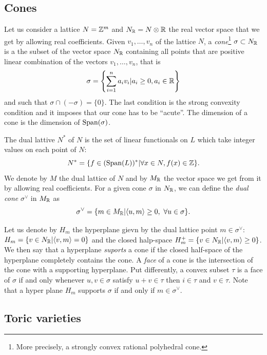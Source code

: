     \subsection{Cones}

        Let us consider a lattice $N=\mathbb{Z}^m$ and $N_{\mathbb{R}}=N\otimes\mathbb{R}$ the real vector space that we get by allowing real coefficients. Given $v_1,\dots,v_n$ of the lattice $N$, a \emph{cone}\footnote{More precisely, a strongly convex rational polyhedral cone.} $\sigma\subset N_{\mathbb{R}}$ is a the subset of the vector space $N_{\mathbb{R}}$ containing all points that are positive linear combination of the vectors $v_1,\dots,v_n$, that is
        \begin{equation}
            \sigma=\left\{\sum^n_{i=1}a_iv_i|a_i\geq0,a_i\in\mathbb{R}\right\}
        \end{equation}
        and such that $\sigma\cap(-\sigma)=\{0\}$. The last condition is the strong convexity condition and it imposes that our cone has to be ``acute''. The dimension of a cone is the dimension of $\text{Span}(\sigma)$.
        
        The dual lattive $N^*$ of $N$ is the set of linear functionals on $L$ which take integer values on each point of $N$:
        \begin{equation}
            N^*=\{f\in(\text{Span}(L))^*|\forall x\in N,f(x)\in\mathbb{Z}\}.
        \end{equation}
        We denote by $M$ the dual lattice of $N$ and by $M_{\mathbb{R}}$ the vector space we get from it by allowing real coefficients. For a given cone $\sigma$ in $ N_{\mathbb{R}}$, we can define the \emph{dual cone} $\sigma^\vee$ in $M_{\mathbb{R}}$ as
        \begin{equation}
            \sigma^\vee=\{m\in M_{\mathbb{R}}|\langle u,m\rangle\geq0,~ \forall u\in\sigma\}.
        \end{equation}

        Let us denote by $H_m$ the hyperplane gievn by the dual lattice point $m\in\sigma^\vee$: $H_m=\{v\in N_{\mathbb{R}}|\langle v,m\rangle=0\}$ and the closed halp-space $H^+_m=\{v\in N_{\mathbb{R}}|\langle v,m\rangle\geq0\}$. We then say that a hyperplane \emph{suports} a cone if the closed half-space of the hyperplane completely contains the cone. A \emph{face} of a cone is the intersection of the cone with a supporting hyperplane. Put differently, a convex subset $\tau$ is a face of $\sigma$ if and only whenever $u,v\in\sigma$ satisfy $u+v\in\tau$ then $i\in\tau$ and $v\in\tau$. Note that a hyper plane $H_m$ supports $\sigma$ if and only if $m\in\sigma^\vee$.

    \subsection{Toric varieties}

